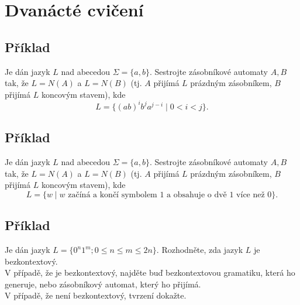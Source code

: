 \section{Dvanácté cvičení}

\subsection{Příklad}
Je dán jazyk $L$ nad abecedou $\Sigma = \{a,b\}$. Sestrojte zásobníkové automaty $A,B$ tak, že $L = N(A)$ a $L = N(B)$ 
(tj. $A$ přijímá $L$ prázdným zásobníkem, $B$ přijímá $L$ koncovým stavem), kde
\[L = \{(ab)^i b^j a^{j-i} \mid 0 < i < j\}\text{.}\]


\subsection{Příklad}
Je dán jazyk $L$ nad abecedou $\Sigma = \{a,b\}$. Sestrojte zásobníkové automaty $A,B$ tak, že $L = N(A)$ a $L = N(B)$ 
(tj. $A$ přijímá $L$ prázdným zásobníkem, $B$ přijímá $L$ koncovým stavem), kde
\[L = \{w \mid w \text{ začíná a končí symbolem } 1 \text{ a obsahuje o dvě } 1 \text{ více než } 0\}\text{.}\]

\subsection{Příklad}
Je dán jazyk $L = \{0^n 1^m; 0 \leq n \leq m \leq 2n\}$. Rozhodněte, zda jazyk $L$ je bezkontextový.\\
V případě, že je bezkontextový, najděte buď bezkontextovou gramatiku, která ho generuje, nebo zásobníkový automat, který 
ho přijímá.\\
V případě, že není bezkontextový, tvrzení dokažte.